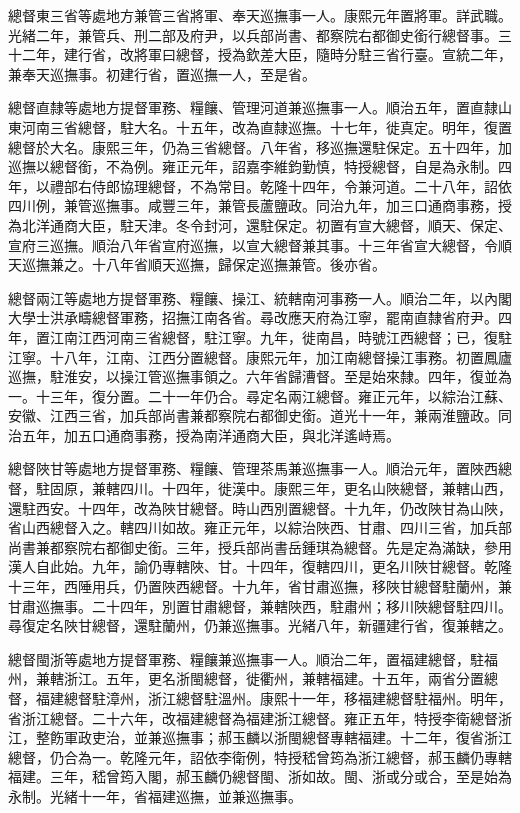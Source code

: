 \begin{pinyinscope}
總督東三省等處地方兼管三省將軍、奉天巡撫事一人。康熙元年置將軍。詳武職。光緒二年，兼管兵、刑二部及府尹，以兵部尚書、都察院右都御史銜行總督事。三十二年，建行省，改將軍曰總督，授為欽差大臣，隨時分駐三省行臺。宣統二年，兼奉天巡撫事。初建行省，置巡撫一人，至是省。

總督直隸等處地方提督軍務、糧饟、管理河道兼巡撫事一人。順治五年，置直隸山東河南三省總督，駐大名。十五年，改為直隸巡撫。十七年，徙真定。明年，復置總督於大名。康熙三年，仍為三省總督。八年省，移巡撫還駐保定。五十四年，加巡撫以總督銜，不為例。雍正元年，詔嘉李維鈞勤慎，特授總督，自是為永制。四年，以禮部右侍郎協理總督，不為常目。乾隆十四年，令兼河道。二十八年，詔依四川例，兼管巡撫事。咸豐三年，兼管長蘆鹽政。同治九年，加三口通商事務，授為北洋通商大臣，駐天津。冬令封河，還駐保定。初置有宣大總督，順天、保定、宣府三巡撫。順治八年省宣府巡撫，以宣大總督兼其事。十三年省宣大總督，令順天巡撫兼之。十八年省順天巡撫，歸保定巡撫兼管。後亦省。

總督兩江等處地方提督軍務、糧饟、操江、統轄南河事務一人。順治二年，以內閣大學士洪承疇總督軍務，招撫江南各省。尋改應天府為江寧，罷南直隸省府尹。四年，置江南江西河南三省總督，駐江寧。九年，徙南昌，時號江西總督；已，復駐江寧。十八年，江南、江西分置總督。康熙元年，加江南總督操江事務。初置鳳廬巡撫，駐淮安，以操江管巡撫事領之。六年省歸漕督。至是始來隸。四年，復並為一。十三年，復分置。二十一年仍合。尋定名兩江總督。雍正元年，以綜治江蘇、安徽、江西三省，加兵部尚書兼都察院右都御史銜。道光十一年，兼兩淮鹽政。同治五年，加五口通商事務，授為南洋通商大臣，與北洋遙峙焉。

總督陜甘等處地方提督軍務、糧饟、管理茶馬兼巡撫事一人。順治元年，置陜西總督，駐固原，兼轄四川。十四年，徙漢中。康熙三年，更名山陜總督，兼轄山西，還駐西安。十四年，改為陜甘總督。時山西別置總督。十九年，仍改陜甘為山陜，省山西總督入之。轄四川如故。雍正元年，以綜治陜西、甘肅、四川三省，加兵部尚書兼都察院右都御史銜。三年，授兵部尚書岳鍾琪為總督。先是定為滿缺，參用漢人自此始。九年，諭仍專轄陜、甘。十四年，復轄四川，更名川陜甘總督。乾隆十三年，西陲用兵，仍置陜西總督。十九年，省甘肅巡撫，移陜甘總督駐蘭州，兼甘肅巡撫事。二十四年，別置甘肅總督，兼轄陜西，駐肅州；移川陜總督駐四川。尋復定名陜甘總督，還駐蘭州，仍兼巡撫事。光緒八年，新疆建行省，復兼轄之。

總督閩浙等處地方提督軍務、糧饟兼巡撫事一人。順治二年，置福建總督，駐福州，兼轄浙江。五年，更名浙閩總督，徙衢州，兼轄福建。十五年，兩省分置總督，福建總督駐漳州，浙江總督駐溫州。康熙十一年，移福建總督駐福州。明年，省浙江總督。二十六年，改福建總督為福建浙江總督。雍正五年，特授李衛總督浙江，整飭軍政吏治，並兼巡撫事；郝玉麟以浙閩總督專轄福建。十二年，復省浙江總督，仍合為一。乾隆元年，詔依李衛例，特授嵇曾筠為浙江總督，郝玉麟仍專轄福建。三年，嵇曾筠入閣，郝玉麟仍總督閩、浙如故。閩、浙或分或合，至是始為永制。光緒十一年，省福建巡撫，並兼巡撫事。


\end{pinyinscope}
